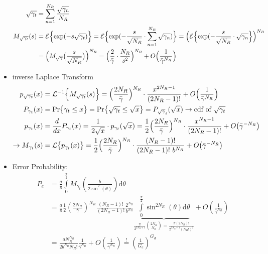 \documentclass[a4paper, 10pt]{article}
\begin{document}
\begin{itemize}
\begin{align*}
		\sqrt{\gamma _t} &= \sum_{n = 1}^{N_R}\frac{\sqrt{\gamma _n}}{N_R}\\
		 M_{\sqrt{\gamma _t}}(s) &= \mathcal{E}\Bigl\{\mathrm{exp}({-s\sqrt{\gamma _t}})\Bigr\} = \mathcal{E}\Bigl\{\mathrm{exp}({-\frac{s}{\sqrt{N_R}}\cdot \sum_{n = 1}^{N_R}\sqrt{\gamma _n}})\Bigr\} = \Bigl(\mathcal{E}\Bigl\{\mathrm{exp}(-\frac{s}{\sqrt{N_R}}\cdot \sqrt{\gamma _n}\Bigr\}\Bigr)^{N_R}\\
		 &= \Bigl( M_{\sqrt{\gamma}}\bigl(\frac{s}{\sqrt{N_R}}\bigr) \Bigr)^{N_R} = \Bigl(\frac{2}{\bar{\gamma}}\cdot \frac{N_R}{s^2}\Bigr)^{N_R} + O\Bigl(\frac{1}{\bar{\gamma}^{N_R}}\Bigr)\\
	\end{align*}
	\item inverse Laplace Transform
	\begin{align*}
		p_{\sqrt{\gamma _t}}(x) &= \mathcal{L} ^{-1}\Bigl\{M_{\sqrt{\gamma _t}}(s)\Bigr\} = \Bigl(\frac{2N_R}{\bar{\gamma}}\Bigr)^{N_R}\cdot \frac{x^{2N_R-1}}{(2N_R-1)!} + O\Bigl(	\frac{1}{\bar{\gamma}^{N_R}}\Bigr)\\
		P_{\gamma _t}(x) &= \text{Pr}\bigl\{\gamma _t\leq x	\bigr\} =  \text{Pr}\bigl\{\sqrt{\gamma _t}\leq \sqrt{x}\bigr\} = P_{\sqrt\gamma _t}(\sqrt{x}) \rightarrow \text{cdf of } \sqrt{\gamma _t}\\
		p_{\gamma _t}(x) &= \frac{d}{dx}P_{\gamma _t}(x) = \frac{1}{2\sqrt{x}}\cdot p_{\gamma _t}(\sqrt{x}) = \frac{1}{2}\Bigl(\frac{2N_R}{\bar{\gamma}} \Bigr)^{N_R}\cdot \frac{x^{N_R-1}}{(2N_R-1)!} + O\bigl(\bar{\gamma}^{-N_R}\bigr)\\
		\rightarrow M_{\gamma _t}(s) &= \mathcal{L}\bigl\{p_{\gamma _t}(x)\bigr\} = \frac{1}{2}\Bigl( \frac{2N_R}{\bar{\gamma}}\Bigr)^{N_R}\cdot \frac{(N_R - 1)!}{(2N_R -1)!~b^{N_R}} + O\bigl(\bar{\gamma}^{-N_R}\bigr)\\
	\end{align*}
	\item Error Probability:
\begin{align*}
        P_e&=\frac{a}{\pi}\int\limits_0^{\frac{\pi}{2}}M_{\gamma_t}\left(\frac{b}{2\sin^2(\theta)}\right)\mathrm{d}\theta\\
        &=\frac{a}{\pi}\frac{1}{2}\left(\frac{2N_R}{\bar{\gamma}}\right)^{N_R}\frac{(N_R-1)!}{(2N_R-1)!}
        \frac{2^{N_R}}{b^{N_R}}
        \underbrace{\int\limits_0^{\frac{\pi}{2}}\sin^{2N_R}(\theta)\mathrm{d}\theta}_
        {\frac{\pi}{2^{2N_R+1}}\binom{2N_R}{N_R}=\frac{\pi(2N_R)!}{2^{2N_R+1}(N_R!)^2}}
        +O\left(\frac{1}{\bar{\gamma}^{N_R}}\right)\\
        &= \frac{aN_R^{N_R}}{2b^{N_R}N_R!}\frac{1}{\bar{\gamma}^{N_R}}+O\left(\frac{1}{\bar{\gamma}^{N_R}}\right)
        \overset{!}{=}\left(\frac{1}{G_c}\right)^{G_d}
\end{align*}


\end{itemize}
\end{document}
